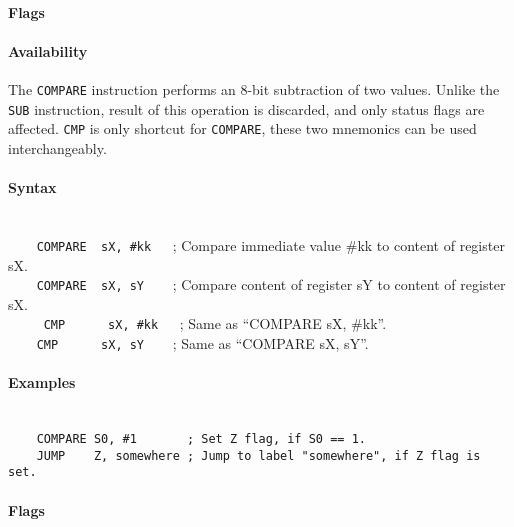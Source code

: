         \paragraph{Flags}

        \paragraph{Availability}
            \pbavailability{\yes}{\no}{\no}{\no}{\no}

    \clearpage
        The \texttt{COMPARE} instruction performs an 8-bit subtraction of two values. Unlike the \texttt{SUB} instruction, result of this operation is discarded, and only status flags are affected. \texttt{CMP} is only shortcut for \texttt{COMPARE}, these two mnemonics can be used interchangeably.

        \paragraph{Syntax}
            ~\\
            \verb'    COMPARE  sX, #kk   '; Compare immediate value \#kk to content of register sX.\\
            \verb'    COMPARE  sX, sY    '; Compare content of register sY to content of register sX.\\\
            \verb'    CMP      sX, #kk   '; Same as ``COMPARE sX, \#kk''.\\
            \verb'    CMP      sX, sY    '; Same as ``COMPARE sX, sY''.

        \paragraph{Examples}
            ~\\
            \verb'    COMPARE S0, #1       ; Set Z flag, if S0 == 1.'\\
            \verb'    JUMP    Z, somewhere ; Jump to label "somewhere", if Z flag is set.'

        \paragraph{Flags}

